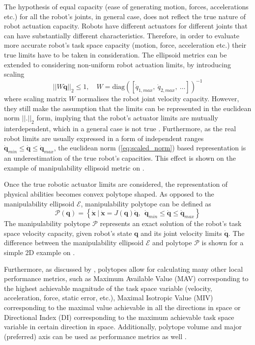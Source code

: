 The hypothesis of equal capacity (ease of generating motion, forces, accelerations etc.) for all the robot's joints, in general case, does not reflect the true nature of robot actuation capacity. Robots have different actuators for different joints that can have substantially different characteristics. Therefore, in order to evaluate more accurate robot's task space capacity (motion, force, acceleration etc.) their true limits have to be taken in consideration. The ellipsoid metrics can be extended to considering non-uniform robot actuation limits, by introducing scaling
\begin{equation}
    ||W\dot{\bm{q}}||_2 \leq 1, \quad W=\text{diag}\left(\left[\dot{q}_{1,max} ,~\dot{q}_{2,max} , ~\ldots\right]\right)^{-1}
    \label{eq:scaled_norm}
\end{equation}    
where scaling matrix $W$ normalises the robot joint velocity capacity. However, they still make the assumption that the limits can be represented in the euclidean norm  $||.||_2$ form, implying that the robot's actuator limits are mutually interdependent, which in a general case is not true \cite{Lee1997manip}. Furthermore, as the real robot limits are usually expressed in a form of independent ranges $ \dot{\bm{q}}_{min} \leq \dot{\bm{q}} \leq \dot{\bm{q}}_{max}$, the euclidean norm (\ref{eq:scaled_norm}) based representation is an underestimation of the true robot's capacities. This effect is shown on the example of manipulability ellipsoid metric on . 

Once the true robotic actuator limits are considered, the representation of physical abilities becomes convex polytope shaped. As opposed to the manipulability ellipsoid $\mathcal{E}$, manipulability polytope can be defined as
\begin{equation}
    \mathcal{P}(\bm{q}) = \left\{ \dot{\bm{x}} ~|~ \dot{\bm{x}} = J(\bm{q})\dot{\bm{q}},~~ \dot{\bm{q}}_{min}\leq\dot{\bm{q}} \leq \dot{\bm{q}}_{max} \right\}
\end{equation}
The manipulability polytope $\mathcal{P}$ represents an exact solution of the robot's task space velocity capacity, given robot's state $\bm{q}$
and its joint velocity limits $\dot{\bm{q}}$. The difference between the manipulability ellipsoid $\mathcal{E}$ and polytope $\mathcal{P}$ is shown for a simple 2D example on .

Furthermore, as discussed by \citet{Finotello1998}, polytopes allow for calculating many other local performance metrics, such as Maximum Available Value (MAV) corresponding to the highest achievable magnitude of the task space variable (velocity, acceleration, force, static error, etc.), Maximal Isotropic Value (MIV) corresponding to the maximal value achievable in all the directions in space or Directional Index (DI) \cite{boschetti_minto_2023} corresponding to the maximum achievable task space variable in certain direction in space. Additionally, polytope volume and major (preferred) axis can be used as performance metrics as well \cite{chiacchio_global_1991, Long2018Evaluating}.

